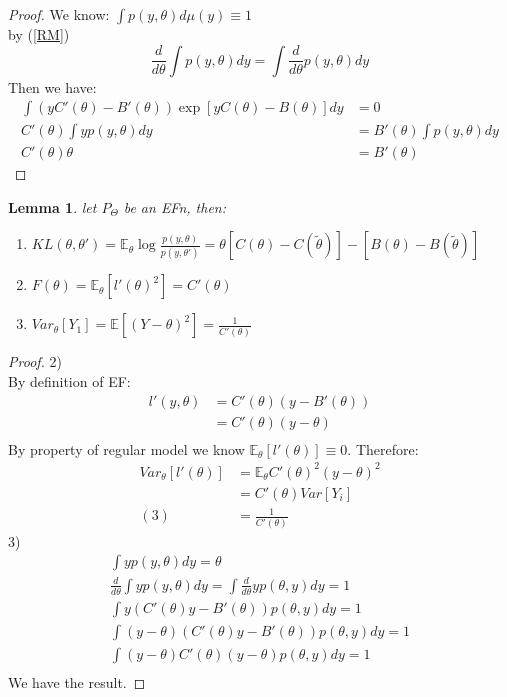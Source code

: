 \documentclass[a4paper,12pt, oneside, fleqn]{book}
\newtheorem{lemma}[theorem]{Lemma}
\theoremstyle{definition}
\theoremstyle{remark}
\begin{document}
\begin{proof}
	We know:
	$\int p(y, \theta) d\mu(y) \equiv 1$ \\
	by (\ref{RM})
	\begin{equation*}
			\frac{d}{d\theta} \int p(y, \theta) dy = \int \frac{d}{d\theta} p(y, \theta) dy
	\end{equation*}
	Then we have:
	\begin{align*}
		\int (y C'(\theta) - B'(\theta)) \exp [yC(\theta) - B(\theta)] dy &= 0 \\
		C'(\theta) \int y p(y, \theta)dy &= B'(\theta) \int p(y, \theta) dy\\
		C'(\theta) \theta &= B'(\theta)
	\end{align*}
\end{proof}

\begin{lemma} \label{theorem: Properties of EFn}
	let $P_\Theta$ be an EFn, then:
	\begin{enumerate}
		\item $KL(\theta, \theta') = \mathbb{E}_\theta \log \frac{p(y, \theta)}{p(y, \theta')} = \theta[C(\theta) - C(\tilde{\theta})] - [B(\theta) - B(\tilde{\theta})] $
		\item $F(\theta) = \mathbb{E}_\theta[ l'(\theta)^2] = C'(\theta)$
		\item $Var_\theta[Y_1] = \mathbb{E}[(Y - \theta)^2] = \frac{1}{C'(\theta)}$
	\end{enumerate}
\end{lemma}

\begin{proof}
	2)\\
	By definition of EF:
	\begin{align*}
		l'(y, \theta) &= C'(\theta)(y - B'(\theta))\\
					  &= C'(\theta)(y - \theta)\\
	\end{align*}
	By property of regular model we know $\mathbb{E}_\theta[l'(\theta)] \equiv 0$. Therefore:
	\begin{align*}
		Var_\theta[l'(\theta)] &= \mathbb{E}_\theta C'(\theta)^2 (y - \theta)^2\\
		&= C'(\theta)Var[Y_i] \\
		(3) &= \frac{1}{C'(\theta)}
	\end{align*}
3)\\
\begin{equation*}
	\begin{aligned}
		\int y p(y, \theta)dy = \theta \\
		\frac{d}{d\theta} \int y p(y, \theta) dy = \int \frac{d}{d\theta} y p(\theta, y) dy = 1\\
		\int y(C'(\theta)y - B'(\theta))p(\theta, y)dy = 1\\
		\int (y - \theta)(C'(\theta)y - B'(\theta))p(\theta, y)dy = 1\\
		\int (y - \theta) C'(\theta)(y - \theta)p(\theta, y)dy = 1\\
	\end{aligned}
\end{equation*}
We have the result.
\end{proof}
\end{document}
